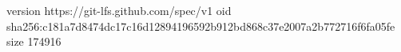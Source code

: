 version https://git-lfs.github.com/spec/v1
oid sha256:c181a7d8474dc17c16d12894196592b912bd868c37e2007a2b772716f6fa05fe
size 174916
